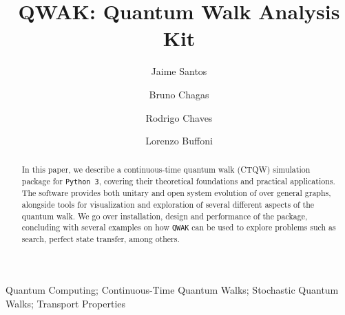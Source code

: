 \documentclass[preprint,12pt]{elsarticle}
\begin{document}
\begin{frontmatter}



\title{QWAK: Quantum Walk Analysis Kit}


\author[a]{Jaime Santos}
\author[b]{Bruno Chagas}
\author[c]{Rodrigo Chaves}
\author[d]{Lorenzo Buffoni}

\address[a]{Haslab, INESC TEC, Portugal}
\address[b]{Mastercard, Dublin, Ireland}
\address[c]{Universidade Federal de Minas Gerais, Brazil}
\address[d]{Department of Physics and Astronomy, University of Florence, 50019 Sesto Fiorentino, Italy}

\begin{abstract}
In this paper, we describe a continuous-time quantum walk (CTQW) simulation
package for \texttt{Python 3}, covering their theoretical foundations and
practical applications. The software provides both unitary and open system
evolution of over general graphs, alongside tools for visualization and
exploration of several different aspects of the quantum walk.  We go over
installation, design and performance of the package, concluding with several
examples on how \texttt{QWAK} can be used to explore problems such as search,
perfect state transfer, among others.
\end{abstract}


\begin{keyword}
Quantum Computing; Continuous-Time Quantum Walks; Stochastic Quantum Walks; Transport Properties

\end{keyword}

\end{frontmatter}
\end{document}
